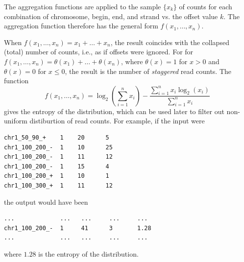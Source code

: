 \documentclass{article}
\begin{document}
The aggregation functions are applied to the sample $\{x_k\}$ of counts for each combination of chromosome, begin, end, and strand vs. the offset value $k$. 
The aggregation function therefore has the general form $f(x_1,\dots,x_n)$. 

When $f(x_1,\dots,x_n) = x_1+\dots+x_n$, the result coincides with the collapsed (total) number of counts, i.e., as if offsets were ignored.
For for $f(x_1,\dots,x_n) = \theta(x_1)+\dots+\theta(x_n)$, where $\theta(x)=1$ for $x>0$ and $\theta(x)=0$ for $x\le0$, the result is the 
number of {\em staggered} read counts. The function 
$$f(x_1,\dots,x_n) = \log_2(\sum\limits_{i=1}^nx_i) - \frac{\sum\limits_{i=1}^nx_i\log_2(x_i)}{\sum\limits_{i=1}^nx_i}$$ 
gives the entropy of the distribution, which can be used later to filter out non-uniform distiburtion of read counts. 
For example, if the input were
\begin{verbatim}
chr1_50_90_+    1    20      5
chr1_100_200_-  1    10      25
chr1_100_200_-  1    11      12
chr1_100_200_-  1    15      4
chr1_100_200_+  1    10      1
chr1_100_300_+  1    11      12
\end{verbatim}
the output would have been
\begin{verbatim}
...             ...   ...     ...     ...
chr1_100_200_-  1     41      3       1.28
...             ...   ...     ...     ...
\end{verbatim}
where $1.28$ is the entropy of the distribution.

\end{document}
